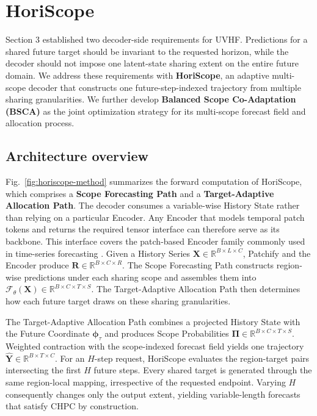 \section{HoriScope}
\label{sec:method}


Section 3 established two decoder-side requirements for UVHF. Predictions for a shared future target should be invariant to the requested horizon, while the decoder should not impose one latent-state sharing extent on the entire future domain. We address these requirements with \textbf{HoriScope}, an adaptive multi-scope decoder that constructs one future-step-indexed trajectory from multiple sharing granularities. We further develop \textbf{Balanced Scope Co-Adaptation (BSCA)} as the joint optimization strategy for its multi-scope forecast field and allocation process.

\subsection{Architecture overview}


Fig.~\ref{fig:horiscope-method} summarizes the forward computation of HoriScope, which comprises a \textbf{Scope Forecasting Path} and a \textbf{Target-Adaptive Allocation Path}. The decoder consumes a variable-wise History State rather than relying on a particular Encoder. Any Encoder that models temporal patch tokens and returns the required tensor interface can therefore serve as its backbone. This interface covers the patch-based Encoder family commonly used in time-series forecasting \citep{nie2023patchtst,zhang2023crossformer}. Given a History Series $\mathbf X\in\mathbb R^{B\times L\times C}$, Patchify and the Encoder produce $\mathbf R\in\mathbb R^{B\times C\times R}$. The Scope Forecasting Path constructs region-wise predictions under each sharing scope and assembles them into $\mathcal F_\theta(\mathbf X)\in\mathbb R^{B\times C\times T\times S}$. The Target-Adaptive Allocation Path then determines how each future target draws on these sharing granularities.

The Target-Adaptive Allocation Path combines a projected History State with the Future Coordinate $\boldsymbol\phi_\tau$ and produces Scope Probabilities $\boldsymbol\Pi\in\mathbb R^{B\times C\times T\times S}$. Weighted contraction with the scope-indexed forecast field yields one trajectory $\widehat{\mathbf Y}\in\mathbb R^{B\times T\times C}$. For an $H$-step request, HoriScope evaluates the region-target pairs intersecting the first $H$ future steps. Every shared target is generated through the same region-local mapping, irrespective of the requested endpoint. Varying $H$ consequently changes only the output extent, yielding variable-length forecasts that satisfy CHPC by construction.

